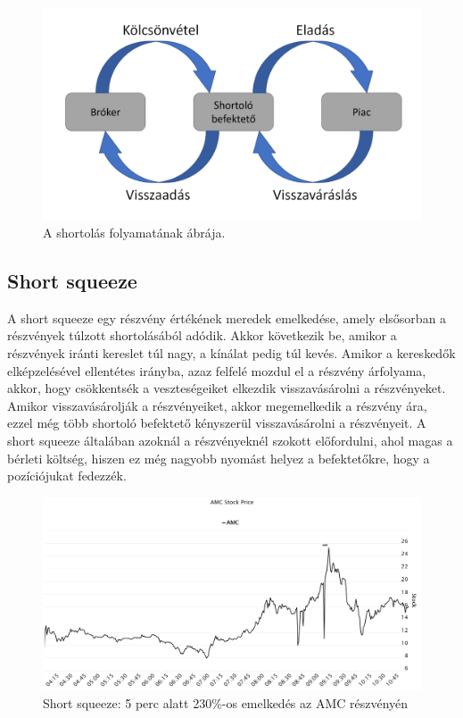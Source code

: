 \begin{figure}[ht]
\centering
\includegraphics[scale=0.20]{images/short.png}
\caption{A shortolás folyamatának ábrája.}
\label{fig:short}
\end{figure}

\subsection{Short squeeze}
A short squeeze egy részvény értékének meredek emelkedése, amely elsősorban a részvények túlzott shortolásából adódik. Akkor következik be, amikor a részvények iránti kereslet túl nagy, a kínálat pedig túl kevés. Amikor a kereskedők elképzelésével ellentétes irányba, azaz felfelé mozdul el a részvény árfolyama, akkor, hogy csökkentsék a veszteségeiket elkezdik visszavásárolni a részvényeket. Amikor visszavásárolják a részvényeiket, akkor megemelkedik a részvény ára, ezzel még több shortoló befektető kényszerül visszavásárolni a részvényeit. A short squeeze általában azoknál a részvényeknél szokott előfordulni, ahol magas a bérleti költség, hiszen ez még nagyobb nyomást helyez a befektetőkre, hogy a pozíciójukat fedezzék.
\begin{figure}[ht]
\centering
\includegraphics[width=\textwidth]{images/short_squeeze.png}
\caption{Short squeeze: 5 perc alatt 230\%-os emelkedés az AMC részvényén}
\label{fig:short_sq}
\end{figure}

